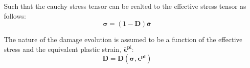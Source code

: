 Such that the cauchy stress tensor can be realted to the effective
stress tensor as follows: 
\begin{equation}
\boldsymbol{\sigma}=(1-\mathbf{D})\boldsymbol{\bar{\sigma}}\label{eqn:const7}
\end{equation}


The nature of the damage evolution is assumed to be a function of
the effective stress and the equivalent plastic strain, $\boldsymbol{\bar{\epsilon}^{pl}}$:
\begin{equation}
\mathbf{D}=\mathbf{D}(\boldsymbol{\bar{\sigma}},\boldsymbol{\bar{\epsilon}^{pl}})\label{eqn:const8}
\end{equation}



